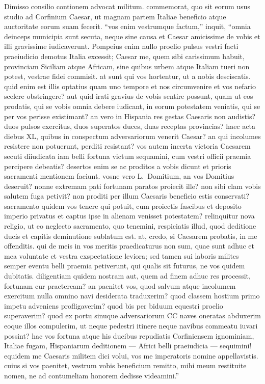Dimisso consilio contionem advocat militum. commemorat, quo sit eorum usus studio ad Corfinium Caesar, ut magnam partem Italiae beneficio atque auctoritate eorum suam fecerit. ``vos enim vestrumque factum,'' inquit, ``omnia deinceps municipia sunt secuta, neque sine causa et Caesar amicissime de vobis et illi gravissime iudicaverunt. Pompeius enim nullo proelio pulsus vestri facti praeiudicio demotus Italia excessit; Caesar me, quem sibi carissimum habuit, provinciam Siciliam atque Africam, sine quibus urbem atque Italiam tueri non potest, vestrae fidei commisit. at sunt qui vos hortentur, ut a nobis desciscatis. quid enim est illis optatius quam uno tempore et nos circumvenire et vos nefario scelere obstringere? aut quid irati gravius de vobis sentire possunt, quam ut eos prodatis, qui se vobis omnia debere iudicant, in eorum potestatem veniatis, qui se per vos perisse existimant? an vero in Hispania res gestas Caesaris non audistis? duos pulsos exercitus, duos superatos duces, duas receptas provincias? haec acta diebus XL, quibus in conspectum adversariorum venerit Caesar? an qui incolumes resistere non potuerunt, perditi resistant? vos autem incerta victoria Caesarem secuti diiudicata iam belli fortuna victum sequamini, cum vestri officii praemia percipere debeatis? desertos enim se ac proditos a vobis dicunt et prioris sacramenti mentionem faciunt. vosne vero L.~Domitium, an vos Domitius deseruit? nonne extremam pati fortunam paratos proiecit ille? non sibi clam vobis salutem fuga petivit? non proditi per illum Caesaris beneficio estis conservati? sacramento quidem vos tenere qui potuit, cum proiectis fascibus et deposito imperio privatus et captus ipse in alienam venisset potestatem? relinquitur nova religio, ut eo neglecto sacramento, quo tenemini, respiciatis illud, quod deditione ducis et capitis deminutione sublatum est. at, credo, si Caesarem probatis, in me offenditis. qui de meis in vos meritis praedicaturus non sum, quae sunt adhuc et mea voluntate et vestra exspectatione leviora; sed tamen sui laboris milites semper eventu belli praemia petiverunt, qui qualis sit futurus, ne vos quidem dubitatis. diligentiam quidem nostram aut, quem ad finem adhuc res processit, fortunam cur praeteream? an paenitet vos, quod salvum atque incolumem exercitum nulla omnino navi desiderata traduxerim? quod classem hostium primo impetu adveniens profligaverim? quod bis per biduum equestri proelio superaverim? quod ex portu sinuque adversariorum CC naves oneratas abduxerim eoque illos compulerim, ut neque pedestri itinere neque navibus commeatu iuvari possint? hac vos fortuna atque his ducibus repudiatis Corfiniensem ignominiam, Italiae fugam, Hispaniarum deditionem — Africi belli praeiudicia — sequimini! equidem me Caesaris militem dici volui, vos me imperatoris nomine appellavistis. cuius si vos paenitet, vestrum vobis beneficium remitto, mihi meum restituite nomen, ne ad contumeliam honorem dedisse videamini.''

